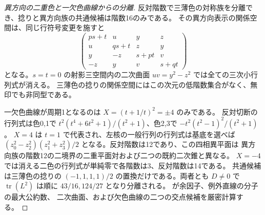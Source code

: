 \begin{proof}[異方向の二重色と一欠色曲線からの分離]
反対階数で三薄色の対称族を分離でき、捻りと異方向族の共通候補は階数16のみである。
その異方向表示の関係空間は、同じ行符号変更を施すと
\[
 \begin{pmatrix}
 ps+t&u&y&z\\u&qs+t&z&y\\y&-z&s+pt&v\\-z&y&v&s+qt
 \end{pmatrix}
\]
となる。$s=t=0$ の射影三空間内の二次曲面 $uv=y^2-z^2$ では全ての三次小行列式が消える。
三薄色の捻りの関係空間にはこの次元の低階数集合がなく、無印でも非同型である。

一欠色曲線が周期1となるのは $X=(t+1/t)^2=\pm4$ のみである。
反対切断の行列式は色0,1で $t^2(t^4+6t^2+1)/(t^2+1)$、色2,3で $-t^2(t^2-1)^2/(t^2+1)$。
$X=4$ は $t=1$ で代表され、左核の一般行列の行列式は基底を選べば
$(z_0^2-z_2^2)(z_1^2+z_3^2)/2$ となる。反対階数は12であり、この四相異平面は
異方向族の階数12の二境界の二重平面対および二つの既約二次錐と異なる。
$X=-4$ では消える二色の行列式が単純零で各階数は3、反対階数は14である。
共通候補は三薄色の捻りの $(-1,1,1,1)/2$ の置換だけである。両者とも $D\ne0$ で
$\operatorname{tr}(L^2)$ は順に $43/16,124/27$ となり分離される。
 が余因子、例外直線の分子の最大公約数、
二次曲面、および欠色曲線の二つの交点候補を厳密計算する。
\end{proof}

